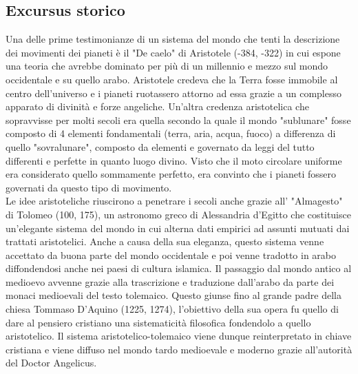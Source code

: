 \subsection*{Excursus storico}
Una delle prime testimonianze di un sistema del mondo che tenti la descrizione dei movimenti dei pianeti è il "De caelo" di Aristotele (-384, -322) in cui espone una teoria che avrebbe dominato per più di un millennio e mezzo sul mondo occidentale e su quello arabo. Aristotele credeva che la Terra fosse immobile al centro dell'universo e i pianeti ruotassero attorno ad essa grazie a un complesso apparato di divinità e forze angeliche. Un'altra credenza aristotelica che sopravvisse per molti secoli era quella secondo la quale il mondo "sublunare" fosse composto di 4 elementi fondamentali (terra, aria, acqua, fuoco) a differenza di quello "sovralunare", composto da elementi e governato da leggi del tutto differenti e perfette in quanto luogo divino. Visto che il moto circolare uniforme era considerato quello sommamente perfetto, era convinto che i pianeti fossero governati da questo tipo di movimento.\\
Le idee aristoteliche riuscirono a penetrare i secoli anche grazie all' "Almagesto" di Tolomeo (100, 175), un astronomo greco di Alessandria d'Egitto che costituisce un'elegante sistema del mondo in cui alterna dati empirici ad assunti mutuati dai trattati aristotelici. Anche a causa della sua eleganza, questo sistema venne accettato da buona parte del mondo occidentale e poi venne tradotto in arabo diffondendosi anche nei paesi di cultura islamica. Il passaggio dal mondo antico al medioevo avvenne grazie alla trascrizione e traduzione dall'arabo da parte dei monaci medioevali del testo tolemaico. Questo giunse fino al grande padre della chiesa Tommaso D'Aquino (1225, 1274), l'obiettivo della sua opera fu quello di dare al pensiero cristiano una sistematicità filosofica fondendolo a quello aristotelico. Il sistema aristotelico-tolemaico viene dunque reinterpretato in chiave cristiana e viene diffuso nel mondo tardo medioevale e moderno grazie all'autorità del Doctor Angelicus. \\
